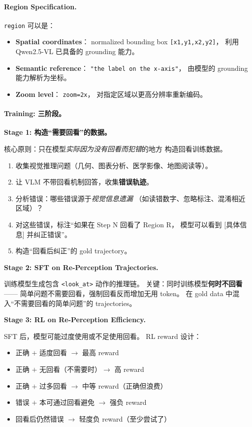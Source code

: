 \documentclass[12pt,a4paper]{article}
\begin{document}
\paragraph{Region Specification.}
\texttt{region} 可以是：
\begin{itemize}[leftmargin=2em]
  \item \textbf{Spatial coordinates}：
    normalized bounding box \texttt{[x1,y1,x2,y2]}，
    利用 Qwen2.5-VL 已具备的 grounding 能力。
  \item \textbf{Semantic reference}：
    \texttt{"the label on the x-axis"}，
    由模型的 grounding 能力解析为坐标。
  \item \textbf{Zoom level}：
    \texttt{zoom=2x}，
    对指定区域以更高分辨率重新编码。
\end{itemize}

\paragraph{Training: 三阶段。}

\textbf{Stage 1: 构造``需要回看''的数据。}

核心原则：只在模型\textit{实际因为没有回看而犯错}的地方
构造回看训练数据。
\begin{enumerate}[leftmargin=2em]
  \item 收集视觉推理问题（几何、图表分析、医学影像、地图阅读等）。
  \item 让 VLM 不带回看机制回答，收集\textbf{错误轨迹}。
  \item 分析错误：哪些错误源于\textit{视觉信息遗漏}
    （如读错数字、忽略标注、混淆相近区域）？
  \item 对这些错误，标注``如果在 Step N 回看了 Region R，
    模型可以看到 [具体信息] 并纠正错误''。
  \item 构造``回看后纠正''的 gold trajectory。
\end{enumerate}

\textbf{Stage 2: SFT on Re-Perception Trajectories.}

训练模型生成包含 \texttt{<look\_at>} 动作的推理链。
关键：同时训练模型\textbf{何时不回看}——
简单问题不需要回看，强制回看反而增加无用 token。
在 gold data 中混入``不需要回看的简单问题''的 trajectories。

\textbf{Stage 3: RL on Re-Perception Efficiency.}

SFT 后，模型可能过度使用或不足使用回看。
RL reward 设计：
\begin{itemize}[leftmargin=2em]
  \item 正确 $+$ 适度回看 $\rightarrow$ 最高 reward
  \item 正确 $+$ 无回看（不需要时）$\rightarrow$ 高 reward
  \item 正确 $+$ 过多回看 $\rightarrow$ 中等 reward（正确但浪费）
  \item 错误 $+$ 本可通过回看避免 $\rightarrow$ 强负 reward
  \item 回看后仍然错误 $\rightarrow$ 轻度负 reward（至少尝试了）
\end{itemize}
\end{document}
